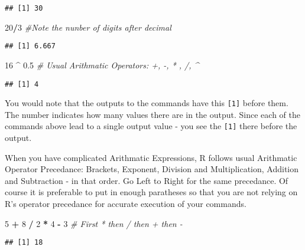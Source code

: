 \documentclass[
]{krantz}
\makeatletter
\newenvironment{Shaded}{\begin{snugshade}}{\end{snugshade}}
\newcommand{\CommentTok}[1]{\textcolor[rgb]{0.37,0.37,0.37}{\textit{#1}}}
\newcommand{\DecValTok}[1]{\textcolor[rgb]{0.06,0.06,0.06}{#1}}
\newcommand{\FloatTok}[1]{\textcolor[rgb]{0.06,0.06,0.06}{#1}}
\newcommand{\OperatorTok}[1]{\textcolor[rgb]{0.43,0.43,0.43}{\textbf{#1}}}
\newcommand{\StringTok}[1]{\textcolor[rgb]{0.5,0.5,0.5}{#1}}
\newenvironment{kframe}{%
\medskip{}
\setlength{\fboxsep}{.8em}
 \def\at@end@of@kframe{}%
 \ifinner\ifhmode%
  \def\at@end@of@kframe{\end{minipage}}%
  \begin{minipage}{\columnwidth}%
 \fi\fi%
 \def\FrameCommand##1{\hskip\@totalleftmargin \hskip-\fboxsep
 \colorbox{shadecolor}{##1}\hskip-\fboxsep
     \hskip-\linewidth \hskip-\@totalleftmargin \hskip\columnwidth}%
 \MakeFramed {\advance\hsize-\width
   \@totalleftmargin\z@ \linewidth\hsize
   \@setminipage}}%
 {\par\unskip\endMakeFramed%
 \at@end@of@kframe}
\renewenvironment{Shaded}{\begin{kframe}}{\end{kframe}}
\makeatother
\begin{document}
\begin{verbatim}
## [1] 30
\end{verbatim}

\begin{Shaded}
\begin{Highlighting}[]
\DecValTok{20}\OperatorTok{/}\DecValTok{3} \CommentTok{#Note the nunber of digits after decimal}
\end{Highlighting}
\end{Shaded}

\begin{verbatim}
## [1] 6.667
\end{verbatim}

\begin{Shaded}
\begin{Highlighting}[]
\DecValTok{16} \OperatorTok{^}\StringTok{ }\FloatTok{0.5}  \CommentTok{# Usual Arithmatic Operators: +, -, * , /, ^}
\end{Highlighting}
\end{Shaded}

\begin{verbatim}
## [1] 4
\end{verbatim}

You would note that the outputs to the commands have this \texttt{{[}1{]}} before them. The number indicates how many values there are in the output. Since each of the commands above lead to a single output value - you see the \texttt{{[}1{]}} there before the output.

When you have complicated Arithmatic Expressions, R follows usual Arithmatic Operator Precedance: Brackets, Exponent, Division and Multiplication, Addition and Subtraction - in that order. Go Left to Right for the same precedance. Of course it is preferable to put in enough paratheses so that you are not relying on R's operator precedance for accurate execution of your commands.

\begin{Shaded}
\begin{Highlighting}[]
\DecValTok{5} \OperatorTok{+}\StringTok{ }\DecValTok{8} \OperatorTok{/}\StringTok{ }\DecValTok{2} \OperatorTok{*}\StringTok{ }\DecValTok{4} \OperatorTok{-}\StringTok{ }\DecValTok{3} \CommentTok{# First * then / then + then - }
\end{Highlighting}
\end{Shaded}

\begin{verbatim}
## [1] 18
\end{verbatim}
\end{document}
